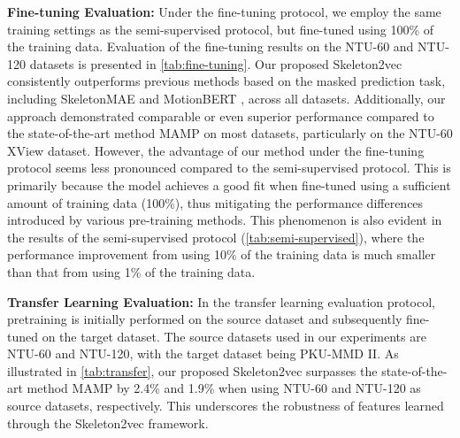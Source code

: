 \noindent \textbf{Fine-tuning Evaluation:}
Under the fine-tuning protocol, we employ the same training settings as the
semi-supervised protocol, but fine-tuned using 100\% of the training data.
Evaluation of the fine-tuning results on the NTU-60 and NTU-120 datasets is
presented in \cref{tab:fine-tuning}. Our proposed Skeleton2vec consistently outperforms
previous methods based on the masked prediction task, including SkeletonMAE \cite{yan2023skeletonmae}
and MotionBERT \cite{zhu2023motionbert}, across all datasets.
Additionally, our approach demonstrated comparable or even superior performance compared
to the state-of-the-art method MAMP \cite{mao2023masked} on most datasets, particularly
on the NTU-60 XView dataset. However, the advantage of our method under the
fine-tuning protocol seems less pronounced compared to the semi-supervised protocol.
This is primarily because the model achieves a good fit when fine-tuned using a
sufficient amount of training data (100\%), thus mitigating the performance differences
introduced by various pre-training methods.
This phenomenon is also evident in the results of the semi-supervised protocol (\cref{tab:semi-supervised}),
where the performance improvement from using 10\% of the training data is much smaller
than that from using 1\% of the training data.

\noindent \textbf{Transfer Learning Evaluation:}
In the transfer learning evaluation protocol, pretraining is initially performed
on the source dataset and subsequently fine-tuned on the target dataset. The
source datasets used in our experiments are NTU-60 and NTU-120, with the target
dataset being PKU-MMD II. As illustrated in \cref{tab:transfer}, our proposed
Skeleton2vec surpasses the state-of-the-art method MAMP by 2.4\% and 1.9\% when
using NTU-60 and NTU-120 as source datasets, respectively. This underscores the
robustness of features learned through the Skeleton2vec framework.

